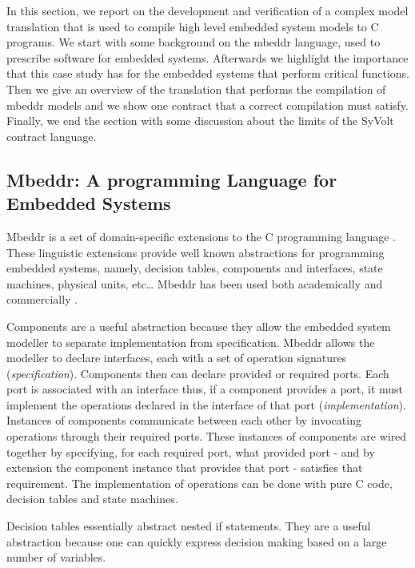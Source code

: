 
In this section, we report on the development and verification of a complex model translation that is used to compile high level embedded system models to C programs.
We start with some background on the mbeddr language, used to prescribe software for embedded systems. Afterwards we highlight the importance that this case study has for the embedded systems that perform critical functions.
Then we give an overview of the translation that performs the compilation of mbeddr models and we show one contract that a correct compilation must satisfy. Finally, we end the section with some discussion about the limits of the SyVolt contract language.

\subsection{Mbeddr: A programming Language for Embedded Systems}

Mbeddr is a set of domain-specific extensions to the C programming language \cite{Voelter:2012:MEC:2384716.2384767}. These linguistic extensions provide well known abstractions for programming embedded systems, namely, decision tables, components and interfaces, state machines, physical units, etc\ldots
Mbeddr has been used both academically and commercially \cite{Voelter2013,Voelter2014,mry_et_al:DR:2014:4543}.

Components are a useful abstraction because they allow the embedded system modeller to separate implementation from specification.
Mbeddr allows the modeller to declare interfaces, each with a set of operation signatures (\emph{specification}). Components then can declare provided or required ports. Each port is associated with an interface thus, if a component provides a port, it must implement the operations declared in the interface of that port (\emph{implementation}). 
Instances of components communicate between each other by invocating operations through their required ports. 
These instances of components are wired together by specifying, for each required port, what provided port - and by extension the component instance that provides that port - satisfies that requirement.
The implementation of operations can be done with pure C code, decision tables and state machines.

Decision tables essentially abstract nested if statements. They are a useful abstraction because one can quickly express decision making based on a large number of variables. 

